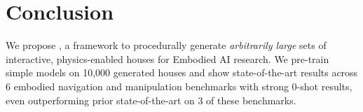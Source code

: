 \section{Conclusion}
\label{sec:conclusion}

We propose \env{}, a framework to procedurally generate \emph{arbitrarily large} sets of interactive, physics-enabled houses for Embodied AI research. 
We pre-train simple models on 10,000 generated houses and show state-of-the-art results across 6 embodied navigation and manipulation benchmarks with strong 0-shot results, even outperforming prior state-of-the-art on 3 of these benchmarks.